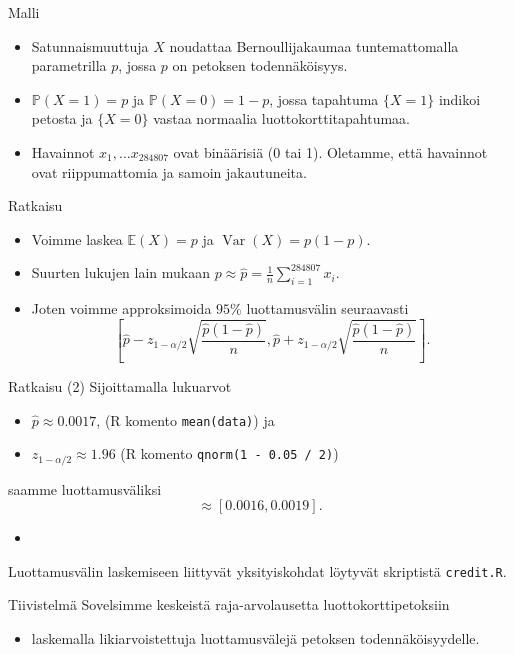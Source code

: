 \documentclass{beamer}
\DeclareMathOperator{\var}{Var}
\begin{document}

\begin{frame}{Malli}
  \begin{itemize}
    \item Satunnaismuuttuja $X$ noudattaa Bernoullijakaumaa tuntemattomalla
    parametrilla $p$, jossa $p$ on petoksen todennäköisyys.
    \item $\mathbb{P}\left(X = 1\right) = p$ ja $\mathbb{P}\left(X = 0\right) =
    1 - p$, jossa tapahtuma $\{X = 1\}$ indikoi petosta ja $\{X = 0\}$ vastaa
    normaalia luottokorttitapahtumaa.
    \item Havainnot $x_1, \ldots x_{284807}$ ovat binäärisiä (0 tai 1).
    Oletamme, että havainnot ovat riippumattomia ja samoin jakautuneita.
  \end{itemize}
\end{frame}


\begin{frame}{Ratkaisu}
  \begin{itemize}
    \item Voimme laskea $\mathbb{E}\left(X\right) = p$ ja $\var\left(X\right) =
    p(1-p)$.
    \item Suurten lukujen lain mukaan $p \approx \hat p =
    \frac{1}{n}\sum_{i=1}^{284807} x_i$.
    \item Joten voimme approksimoida $95\%$ luottamusvälin seuraavasti
    \begin{equation*}
      \left[\hat p - z_{1 - \alpha/2}\sqrt{\frac{\hat p(1-\hat p)}{n}},
      \hat p + z_{1 - \alpha/2}\sqrt{\frac{\hat p(1-\hat p)}{n}}\right].
    \end{equation*}
  \end{itemize}
\end{frame}


\begin{frame}{Ratkaisu (2)}
  Sijoittamalla lukuarvot
  \begin{itemize}
    \item $\hat p\approx 0.0017$, (\textsf{R} komento \texttt{mean(data)}) ja
    \item $z_{1 - \alpha / 2} \approx 1.96$ (\textsf{R} komento \texttt{qnorm(1
    - 0.05 / 2)})
  \end{itemize}
  saamme luottamusväliksi
  \begin{equation*}
    \approx \left[0.0016, 0.0019\right].
  \end{equation*}
  \pause
  \begin{itemize}
    \item[]
  \end{itemize}
  Luottamusvälin laskemiseen liittyvät yksityiskohdat löytyvät skriptistä
  \texttt{credit.R}. 
\end{frame}

\begin{frame}{Tiivistelmä}
  Sovelsimme keskeistä raja-arvolausetta luottokorttipetoksiin
  \pause
  \begin{itemize}
    \item laskemalla likiarvoistettuja luottamusvälejä petoksen
    todennäköisyydelle.
  \end{itemize}
\end{frame}
\end{document}
